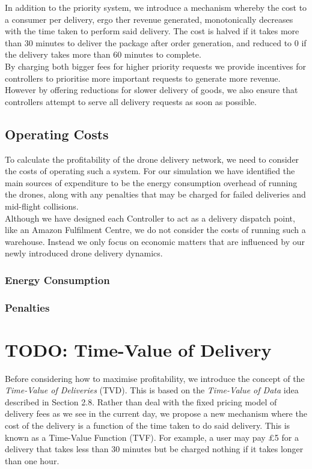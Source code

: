 \documentclass[a4paper,12pt,titlepage]{article}
\begin{document}
In addition to the priority system, we introduce a mechanism whereby the cost to a consumer per delivery, ergo ther revenue generated, monotonically decreases with the time taken to perform said delivery. The cost is halved if it takes more than 30 minutes to deliver the package after order generation, and reduced to 0 if the delivery takes more than 60 minutes to complete.\\

By charging both bigger fees for higher priority requests we provide incentives for controllers to prioritise more important requests to generate more revenue. However by offering reductions for slower delivery of goods, we also ensure that controllers attempt to serve all delivery requests as soon as possible.

\subsection{Operating Costs}
To calculate the profitability of the drone delivery network, we need to consider the costs of operating such a system. For our simulation we have identified the main sources of expenditure to be the energy consumption overhead of running the drones, along with any penalties that may be charged for failed deliveries and mid-flight collisions.\\

Although we have designed each Controller to act as a delivery dispatch point, like an Amazon Fulfilment Centre, we do not consider the costs of running such a warehouse. Instead we only focus on economic matters that are influenced by our newly introduced drone delivery dynamics.

\subsubsection{Energy Consumption}


\subsubsection{Penalties}


\newpage
\section{TODO: Time-Value of Delivery}
Before considering how to maximise profitability, we introduce the concept of the \textit{Time-Value of Deliveries} (TVD). This is based on the \textit{Time-Value of Data} idea described in Section 2.8. Rather than deal with the fixed pricing model of delivery fees as we see in the current day, we propose a new mechanism where the cost of the delivery is a function of the time taken to do said delivery. This is known as a Time-Value Function (TVF). For example, a user may pay £5 for a delivery that takes less than 30 minutes but be charged nothing if it takes longer than one hour.\\
\end{document}
